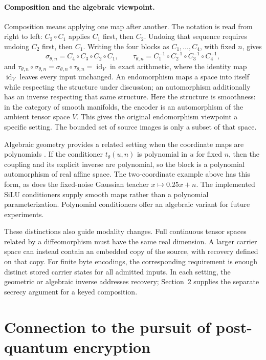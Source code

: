 \documentclass[10pt]{article}
\begin{document}
\paragraph{Composition and the algebraic viewpoint.}
Composition means applying one map after another. The notation is read from
right to left: $C_2\circ C_1$ applies $C_1$ first, then $C_2$. Undoing that
sequence requires undoing $C_2$ first, then $C_1$.
Writing the four blocks as $C_1,\ldots,C_4$, with fixed $n$, gives
\begin{equation}
 \sigma_{\theta,n}=C_4\circ C_3\circ C_2\circ C_1,\qquad
 \tau_{\theta,n}=C_1^{-1}\circ C_2^{-1}\circ C_3^{-1}\circ C_4^{-1},
\end{equation}
and $\tau_{\theta,n}\circ \sigma_{\theta,n}=\sigma_{\theta,n}\circ \tau_{\theta,n}
=\operatorname{id}_V$ in exact arithmetic, where the identity map
$\operatorname{id}_V$ leaves every input unchanged.
An endomorphism maps a space into itself while respecting the structure under
discussion; an automorphism additionally has an inverse respecting that same
structure. Here the structure is smoothness: in the category of smooth manifolds,
the encoder is an automorphism of the ambient tensor space $V$. This gives the
original endomorphism viewpoint a specific setting. The bounded
set of source images is only a subset of that space.

Algebraic geometry provides a related setting when the coordinate maps are
polynomials \cite{vandenessen}. If the conditioner $t_\theta(u,n)$ is polynomial
in $u$ for fixed $n$, then the coupling and its explicit inverse are polynomial,
so the block is a polynomial automorphism of real affine space. The two-coordinate
example above has this form, as does the fixed-noise Gaussian teacher
$x\mapsto0.25x+n$. The implemented SiLU conditioners supply smooth maps rather
than a polynomial parameterization. Polynomial conditioners offer an algebraic
variant for future experiments.

These distinctions also guide modality changes. Full continuous tensor spaces
related by a diffeomorphism must have the same real dimension. A larger carrier
space can instead contain an embedded copy of the source, with recovery defined
on that copy. For finite byte encodings, the corresponding requirement is enough
distinct stored carrier states for all admitted inputs. In each setting, the
geometric or algebraic inverse addresses recovery; Section~2 supplies the
separate secrecy argument for a keyed composition.

\section{Connection to the pursuit of post-quantum encryption}
\end{document}
